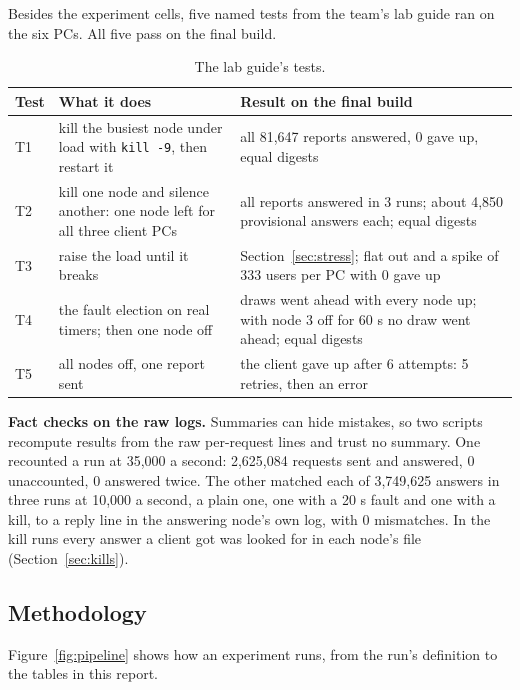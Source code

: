 Besides the experiment cells, five named tests from the team's lab guide ran on the six PCs. All five pass on the final build.

\begin{table}[!htb]
\centering\small
\caption{The lab guide's tests.}
\label{tab:labtests}
\begin{tabularx}{\linewidth}{@{}P{0.6cm}P{4.4cm}L@{}}
\toprule
Test & What it does & Result on the final build \\
\midrule
T1 & kill the busiest node under load with \texttt{kill -9}, then restart it & all 81,647 reports answered, 0 gave up, equal digests \\
T2 & kill one node and silence another: one node left for all three client PCs & all reports answered in 3 runs; about 4,850 provisional answers each; equal digests \\
T3 & raise the load until it breaks & Section~\ref{sec:stress}; flat out and a spike of 333 users per PC with 0 gave up \\
T4 & the fault election on real timers; then one node off & draws went ahead with every node up; with node 3 off for 60 s no draw went ahead; equal digests \\
T5 & all nodes off, one report sent & the client gave up after 6 attempts: 5 retries, then an error \\
\bottomrule
\end{tabularx}
\end{table}

\textbf{Fact checks on the raw logs.} Summaries can hide mistakes, so two scripts recompute results from the raw per-request lines and trust no summary. One recounted a run at 35,000 a second: 2,625,084 requests sent and answered, 0 unaccounted, 0 answered twice. The other matched each of 3,749,625 answers in three runs at 10,000 a second, a plain one, one with a 20 s fault and one with a kill, to a reply line in the answering node's own log, with 0 mismatches. In the kill runs every answer a client got was looked for in each node's file (Section~\ref{sec:kills}).

\subsection{Methodology}
\label{sec:method}

Figure~\ref{fig:pipeline} shows how an experiment runs, from the run's definition to the tables in this report.


